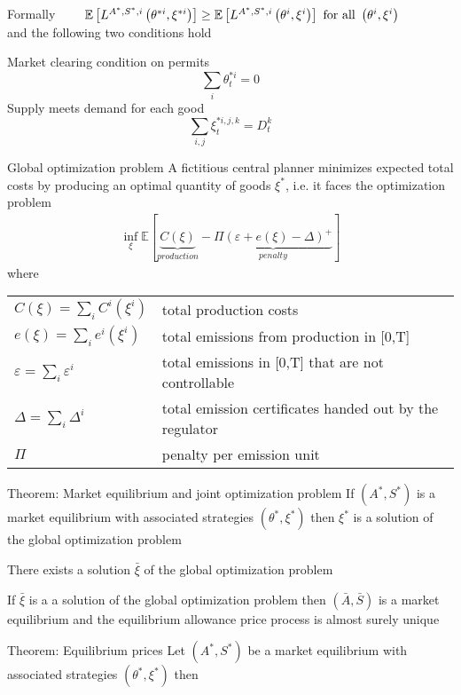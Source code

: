 	Formally
		$
		\qquad \mathbb{E}\left[ L^{A^*, S^*, i}\left(\theta^{*i},\xi^{*i}\right) \right] \ge \mathbb{E}\left[ L^{A^*, S^*, i}\left(\theta^{i},\xi^{i}\right) \right] 
		\textnormal{ for all } \left(\theta^i, \xi^i \right)
		$ \\
	and the following two conditions hold

	Market clearing condition on permits
		$$
		\sum_{i} \theta^{*i}_t = 0
		$$
	Supply meets demand for each good
		$$
		\sum_{i, j} \xi^{*i,j,k}_t = D_t^k
		$$


Global optimization problem
	A fictitious central planner minimizes expected total costs by producing an optimal quantity of goods $\xi^*$, i.e. it faces the optimization problem
		\begin{align}
		\inf_{\xi} \mathbb{E} \left[ \underbrace{C(\xi)}_{production} - \underbrace{\Pi \left(\varepsilon + e(\xi) - \Delta \right)^+}_{penalty} \right]
		\end{align}
	where \\
		\begin{tabular}{ll}
		$C(\xi) =  \sum_{i} C^i(\xi^i)$ & total production costs\\
		$e(\xi) = \sum_{i} e^i(\xi^i)$ & total emissions from production in [0,T] \\
		$\varepsilon = \sum_{i} \varepsilon^i$ & total emissions in [0,T] that are not controllable \\
		$\Delta = \sum_{i} \Delta^i$ & total emission certificates handed out by the regulator \\
		$\Pi$ & penalty per emission unit \\
		\end{tabular}


Theorem: Market equilibrium and joint optimization problem
	If $(A^*,S^*)$ is a market equilibrium with associated strategies
	$(\theta^*,\xi^*)$ then $\xi^*$ is a solution of the global optimization problem
	
	There exists a solution $\bar{\xi}$ of the global optimization problem
	
	If $\bar{\xi}$ is a a solution of the global optimization problem then $(\bar{A}, \bar{S})$ 
	is a market equilibrium and the equilibrium allowance price process is almost surely unique


Theorem: Equilibrium prices
	Let $(A^*,S^*)$ be a market equilibrium with associated strategies $(\theta^*,\xi^*)$ then

